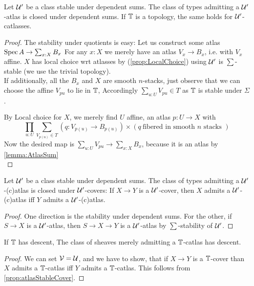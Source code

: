 \begin{theorem}{\label{thm:atlasStableSum}}
	Let $\mathcal{U}'$ be a class stable under dependent sums.
	The class of types admitting a $\mathcal{U}'$-atlas is closed under dependent sums. If $\mathbb{T}$ is a topology, the same holds for $\mathcal{U}'$-catlasses.
\end{theorem}
\begin{proof}
	The stability under quotients is easy: 
	Let us construct some atlas $\operatorname{Spec} A \to \sum_{x : X} B_x$ %
	For any $x : X$ we merely have an atlas $V_x \to B_x$, i.e. with $V_x$ affine. %
	$X$ has local choice wrt atlasses by (\ref{prop:LocalChoice}) using $\mathcal{U}'$ is $\sum$-stable (we use the trivial topology).\\
	If additionally, all the $B_x$ and $X$ are smooth $n$-stacks, just observe that we can choose the affine $V_{p u}$ to lie in $\mathbb{T}$, Accordingly $\sum_{u : U} V_{p u} \in T$ as $\mathbb{T}$ is stable under $\Sigma$.

	By Local choice for $X$, we merely find $U$ affine, an atlas $p : U \to X$ %
	with
	\[
	\prod_{u : U} \sum_{V_{p(u)} \in T} (q : V_{p(u)} \to B_{p(u)}) \times (q \ \text{fibered in smooth } n \text{ stacks } )
	\]
	Now the desired map is $\sum_{u : U} V_{p u} \to \sum_{x : X} B_x$, because it is  an atlas %
	by \ref{lemma:AtlasSum} \\
\end{proof}
\begin{prop}{\label{prop:atlasStableCover}}
	Let $\mathcal{U}'$ be a class stable under dependent sums.
	The class of types admitting a $\mathcal{U}'$-(c)atlas is closed under $\mathcal{U}'$-covers: If $X \to Y$ is a $\mathcal{U}'$-cover, then $X$ admits a $\mathcal{U}'$-(c)atlas iff $Y$ admits a $\mathcal{U}'$-(c)atlas.
\end{prop}
\begin{proof}
One direction is the stability under dependent sums. For the other, if $S \to X$ is a $\mathcal{U}'$-atlas, then $S \to X \to Y$ is a $\mathcal{U}'$-atlas by $\sum$-stability of $\mathcal{U}'$.
\end{proof}

\begin{corollary}{\label{cor:DescentCatlas}}
	If $\mathbb{T}$ has descent, The class of sheaves merely admitting a $\mathbb{T}$-catlas has descent.
\end{corollary}
\begin{proof}
	We can set $\mathcal{V} = \mathcal{U}$, and we have to show, that if $X \to Y$ is a $\mathbb{T}$-cover than $X$ admits a $\mathbb{T}$-catlas iff $Y$ admits a $\mathbb{T}$-catlas. This follows from \ref{prop:atlasStableCover}.
\end{proof}